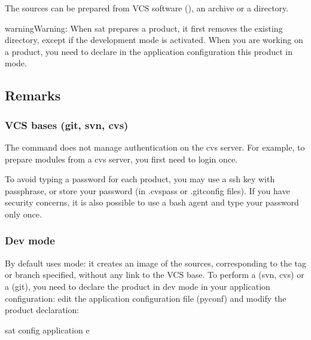 \documentclass[a4paper,10pt,english]{sphinxmanual}
\begin{document}
The sources can be prepared from VCS software (), an archive or a directory.

\begin{sphinxadmonition}{warning}{Warning:}
When sat prepares a product, it first removes the
existing directory, except if the development mode is activated.
When you are working on a product, you need to declare in
the application configuration this product in  mode.
\end{sphinxadmonition}


\subsection{Remarks}
\label{\detokenize{commands/prepare:remarks}}

\subsubsection{VCS bases (git, svn, cvs)}
\label{\detokenize{commands/prepare:vcs-bases-git-svn-cvs}}
The  command does not manage authentication on the cvs server.
For example, to prepare modules from a cvs server, you first need to login once.

To avoid typing a password for each product,
you may use a ssh key with passphrase, or store your password
(in .cvspass or .gitconfig files).
If you have security concerns, it is also possible to use
a bash agent and type your password only once.


\subsubsection{Dev mode}
\label{\detokenize{commands/prepare:dev-mode}}
By default  uses  mode: it creates an image
of the sources, corresponding to the tag or branch specified,
without any link to the VCS base.
To perform a  (svn, cvs) or a  (git),
you need to declare the product in dev mode in your application configuration:
edit the application configuration file (pyconf) and modify the product declaration:

%
\begin{sphinxVerbatim}[commandchars=\\\{\}]
sat config \PYGZlt{}application\PYGZgt{} \PYGZhy{}e
\end{sphinxVerbatim}
\end{document}
